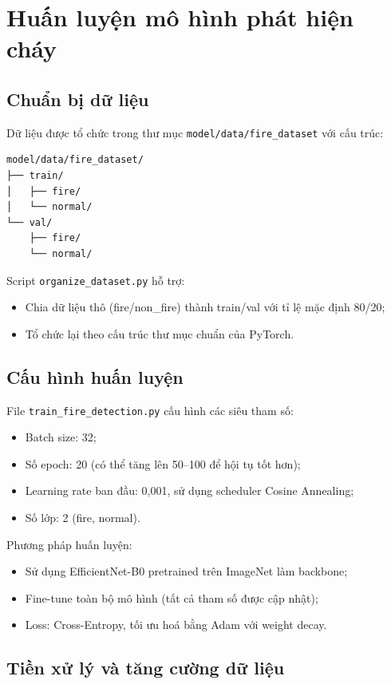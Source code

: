 \documentclass[12pt,a4paper]{report}
\begin{document}
\section{Huấn luyện mô hình phát hiện cháy}

\subsection{Chuẩn bị dữ liệu}

Dữ liệu được tổ chức trong thư mục \texttt{model/data/fire\_dataset} với cấu trúc:
\begin{verbatim}
model/data/fire_dataset/
├── train/
│   ├── fire/
│   └── normal/
└── val/
    ├── fire/
    └── normal/
\end{verbatim}

Script \texttt{organize\_dataset.py} hỗ trợ:
\begin{itemize}
  \item Chia dữ liệu thô (fire/non\_fire) thành train/val với tỉ lệ mặc định 80/20;
  \item Tổ chức lại theo cấu trúc thư mục chuẩn của PyTorch.
\end{itemize}

\subsection{Cấu hình huấn luyện}

File \texttt{train\_fire\_detection.py} cấu hình các siêu tham số:
\begin{itemize}
  \item Batch size: 32;
  \item Số epoch: 20 (có thể tăng lên 50--100 để hội tụ tốt hơn);
  \item Learning rate ban đầu: 0{,}001, sử dụng scheduler Cosine Annealing;
  \item Số lớp: 2 (fire, normal).
\end{itemize}

Phương pháp huấn luyện:
\begin{itemize}
  \item Sử dụng EfficientNet-B0 pretrained trên ImageNet làm backbone;
  \item Fine-tune toàn bộ mô hình (tất cả tham số được cập nhật);
  \item Loss: Cross-Entropy, tối ưu hoá bằng Adam với weight decay.
\end{itemize}

\subsection{Tiền xử lý và tăng cường dữ liệu}
\end{document}
